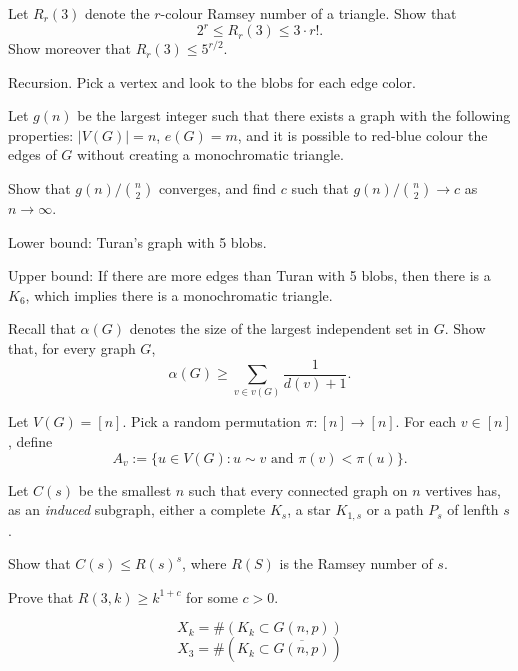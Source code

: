 \documentclass[10pt, a4paper]{article}
\begin{document}
\newpage
\begin{prob}
	Let $R_r(3)$ denote the $r$-colour Ramsey number of a triangle. Show that \[
		2^r \leqslant R_r(3) \leqslant 3 \cdot r!.
	\]
	Show moreover that $R_r(3) \leqslant 5^{r/2}$.
\end{prob}
\begin{sk}
	Recursion. Pick a vertex and look to the blobs for each edge color.
\end{sk}

\newpage
\begin{prob}
	Let $g(n)$ be the largest integer such that there exists a graph with the following properties: $|V(G)| = n$, $e(G) = m$, and it is possible to red-blue colour the edges of $G$ without creating a monochromatic triangle.

	Show that $g(n)/\binom{n}{2}$ converges, and find $c$ such that $g(n)/\binom{n}{2} \to c$ as $n \to \infty$.
\end{prob}
\begin{sk}
Lower bound:
Turan's graph with 5 blobs.

Upper bound: If there are more edges than Turan with 5 blobs, then there is a $K_6$, which implies there is a monochromatic triangle.
\end{sk}

\newpage
\begin{prob}
	Recall that $\alpha(G)$ denotes the size of the largest independent set in $G$. Show that, for every graph $G$, \[
		\alpha(G) \geqslant \sum_{v \in v(G)} \frac{1}{d(v) + 1}.
	\]
\end{prob}
\begin{sk}
	Let $V(G) = [n].$
	Pick a random permutation $\pi \colon [n] \to [n]$. For each $v \in [n]$, define \[A_v := \{ u \in V(G) : u \sim v \text{ and } \pi(v) < \pi(u)\}.\]
\end{sk}

\newpage
\begin{prob}
	Let $C(s)$ be the smallest $n$ such that every connected graph on $n$ vertives has, as an \emph{induced} subgraph, either a complete $K_s$, a star $K_{1, s}$ or a path $P_s$ of lenfth $s$.

	Show that $C(s) \leqslant R(s)^s$, where $R(S)$ is the Ramsey number of $s$.
\end{prob}
\begin{sol}
	
\end{sol}

\newpage
\begin{prob}
	Prove that $R(3, k) \geqslant k^{1+c}$ for some $c > 0$.
\end{prob}
\begin{sk}
	\[
		X_k = \#(K_k \subset G(n, p))
	\]
	\[
		X_3 = \#(K_k \subset \overline{G(n, p)})
	\]
\end{sk}
\end{document}
